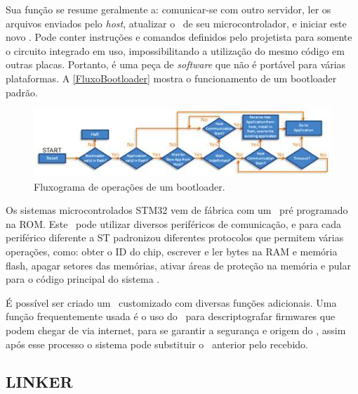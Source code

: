Sua função se resume geralmente a: comunicar-se com outro servidor, ler os arquivos enviados pelo \textit{host}, atualizar o \firmware\ de seu microcontrolador, e iniciar este novo \software. 
Pode conter instruções e comandos definidos pelo projetista para somente o circuito integrado em uso, impossibilitando a utilização do mesmo código em outras placas.
Portanto, é uma peça de \textit{software} que não é portável para várias plataformas. A \autoref{FluxoBootloader} mostra o funcionamento de um bootloader padrão. 

\begin{figure}[H]
    \scriptsize
     \centering
     \includegraphics[scale=1]{dados/figuras/FluxoBootloader.jpg}
     \caption{Fluxograma de operações de um bootloader.}
     \label{FluxoBootloader}
\end{figure}



Os sistemas microcontrolados STM32 vem de fábrica com um \bootloader\ pré programado na ROM. Este \bootloader\ pode utilizar diversos periféricos de comunicação, e para cada periférico diferente a ST padronizou diferentes protocolos que permitem várias operações, como: obter o ID do chip, escrever e ler bytes na RAM e memória flash, apagar setores das memórias, ativar áreas de proteção na memória e pular para o código principal do sistema \cite{Noviello2018}.

É possível ser criado um \bootloader\ customizado com diversas funções adicionais. Uma função frequentemente usada é o uso do \bootloader\ para descriptografar firmwares que podem chegar de via internet, para se garantir a segurança e origem do \firmware, assim após esse processo o sistema pode substituir o \software\ anterior pelo recebido. 



\subsection{LINKER}


